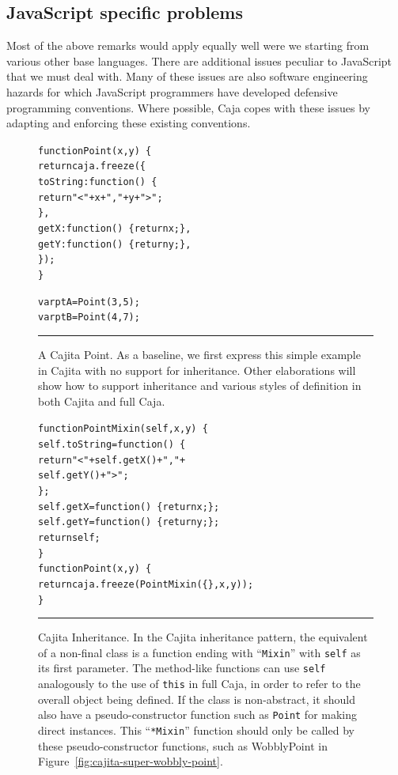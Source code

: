 \documentclass[letterpaper,twocolumn,10pt]{article}
\newcommand{\code}[1]{{\tt {#1}}}              %
\begin{document}
\subsection{JavaScript specific problems}
\label{subsec:js-probs}

Most of the above remarks would apply equally well were we starting from 
various other base languages. There are additional issues peculiar to 
JavaScript that we must deal with. Many of these issues are also software 
engineering hazards for which JavaScript programmers have developed 
defensive programming conventions. Where possible, Caja copes with these 
issues by adapting and enforcing these existing conventions.

\begin{figure}[t!]
\begin{alltt}
function Point(x, y)\ \{
  return caja.freeze(\{
    toString: function()\ \{ 
      return "<" + x + "," + y + ">"; 
    \},
    getX: function()\ \{ return x; \},
    getY: function()\ \{ return y; \},
  \});
\}

var ptA = Point(3, 5);
var ptB = Point(4, 7);
\end{alltt}

\caption[A Cajita Point.]{A Cajita Point. As a baseline, we first express 
this simple example in Cajita with no support for inheritance. Other 
elaborations will show how to support inheritance and various styles of 
definition in both Cajita and full Caja. 
\\ } \hrule
\label{fig:cajita-point}
\end{figure}

\begin{figure}[t!]
\begin{alltt}
function PointMixin(self, x, y)\ \{
  self.toString = function()\ \{ 
    return "<" + self.getX() + "," + 
                 self.getY() + ">"; 
  \};
  self.getX = function()\ \{ return x; \};
  self.getY = function()\ \{ return y; \};
  return self;
\}
function Point(x, y)\ \{
  return caja.freeze(PointMixin(\{\}, x, y));
\}
\end{alltt}

\caption[Cajita Inheritance.]{Cajita Inheritance. In the Cajita inheritance 
pattern, the equivalent of a non-final class is a function ending with 
``\code{Mixin}'' with \code{self} as its first parameter. The method-like 
functions can use \code{self} analogously to the use of \code{this} in full 
Caja, in order to refer to the overall object being defined. 
If the class is non-abstract, it should also have a pseudo-constructor function 
such as \code{Point} for making direct instances. This 
``\code{*Mixin}'' function should only be called by these pseudo-constructor 
functions, such as WobblyPoint in Figure~\ref{fig:cajita-super-wobbly-point}.\\ } \hrule
\label{fig:cajita-super-point}
\end{figure}
\end{document}
